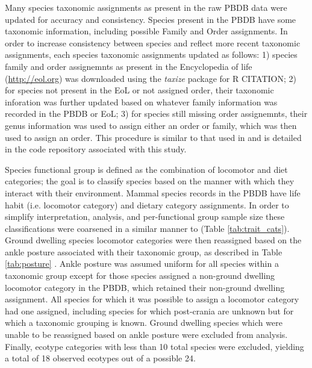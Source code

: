 \documentclass[12pt,letterpaper]{article}
\begin{document}
Many species taxonomic assignments as present in the raw PBDB data were updated for accuracy and consistency. Species present in the PBDB have some taxonomic information, including possible Family and Order assignments. In order to increase consistency between species and reflect more recent taxonomic assignments, each species taxonomic assignments updated as follows: 1) species family and order assignemnts as present in the Encyclopedia of life (\url{http://eol.org}) was downloaded using the \textit{taxize} package for R CITATION; 2) for species not present in the EoL or not assigned order, their taxonomic inforation was further updated based on whatever family information was recorded in the PBDB or EoL; 3) for species still missing order assignemnts, their genus information was used to assign either an order or family, which was then used to assign an order. This procedure is similar to that used in \citet{Smits2015b} and is detailed in the code repository associated with this study.
%  


Species functional group is defined as the combination of locomotor and diet categories; the goal is to classify species based on the manner with which they interact with their environment. Mammal species records in the PBDB have life habit (i.e. locomotor category) and dietary category assignments. In order to simplify interpretation, analysis, and per-functional group sample size these classifications were coarsened in a similar manner to \citet{Smits2015b} (Table \ref{tab:trait_cats}). Ground dwelling species locomotor categories were then reassigned based on the ankle posture associated with their taxonomic group, as described in Table \ref{tab:posture} \citep{Carrano1999}. Ankle posture was assumed uniform for all species within a taxonomic group except for those species assigned a non-ground dwelling locomotor category in the PBDB, which retained their non-ground dwelling assignment. All species for which it was possible to assign a locomotor category had one assigned, including species for which post-crania are unknown but for which a taxonomic grouping is known. Ground dwelling species which were unable to be reassigned based on ankle posture were excluded from analysis. Finally, ecotype categories with less than 10 total species were excluded, yielding a total of 18 observed ecotypes out of a possible 24.
\end{document}
